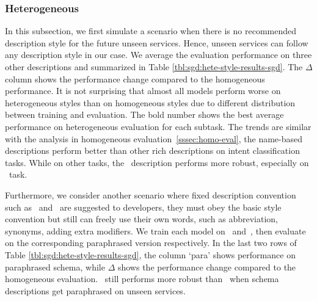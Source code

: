 \subsubsection{Heterogeneous}
\label{sssec:heter-eval}
In this subsection, we first simulate a scenario when there is no
recommended description style for the future unseen services. Hence,
unseen services can follow any description style in our case. We
average the evaluation performance on three other descriptions and
summarized in Table \ref{tbl:sgd:hete-style-results-sgd}. The $\Delta$ column
shows the performance change compared to the homogeneous
performance. It is not surprising that almost all models perform worse
on heterogeneous styles than on homogeneous styles due to different
distribution between training and evaluation. The bold number shows
the best average performance on heterogeneous evaluation for each
subtask. The trends are similar with the analysis in homogeneous
evaluation~\ref{sssec:homo-eval}, the name-based descriptions perform
better than other rich descriptions on intent classification
tasks. While on other tasks, the \ORIGIN~description performs more
robust, especially on \NSL~task.

Furthermore, we consider another scenario where fixed description
convention such as \NAMEONLY~and \ORIGIN~are suggested to developers,
they must obey the basic style convention but still can freely use
their own words, such as abbreviation, synonyms, adding extra
modifiers. We train each model on \NAMEONLY~and~\ORIGIN, then evaluate
on the corresponding paraphrased version respectively. In the last two
rows of Table \ref{tbl:sgd:hete-style-results-sgd}, the column `para'
shows performance on paraphrased schema, while $\Delta$ shows the
performance change compared to the homogeneous evaluation.
\ORIGIN~still performs more robust than \NAMEONLY~when schema
descriptions get paraphrased on unseen services.


